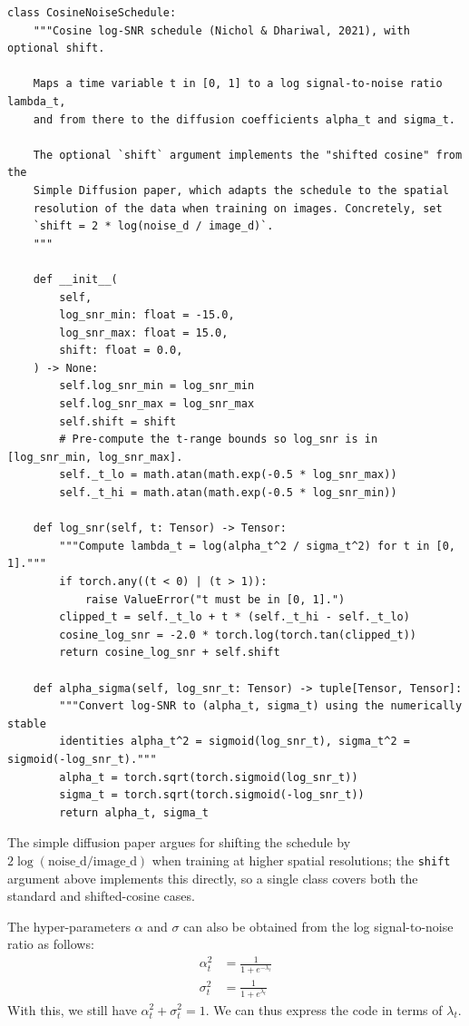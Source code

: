 \documentclass[usenames,dvipsnames]{article}
\begin{document}
\begin{verbatim}
class CosineNoiseSchedule:
    """Cosine log-SNR schedule (Nichol & Dhariwal, 2021), with optional shift.

    Maps a time variable t in [0, 1] to a log signal-to-noise ratio lambda_t,
    and from there to the diffusion coefficients alpha_t and sigma_t.

    The optional `shift` argument implements the "shifted cosine" from the
    Simple Diffusion paper, which adapts the schedule to the spatial
    resolution of the data when training on images. Concretely, set
    `shift = 2 * log(noise_d / image_d)`.
    """

    def __init__(
        self,
        log_snr_min: float = -15.0,
        log_snr_max: float = 15.0,
        shift: float = 0.0,
    ) -> None:
        self.log_snr_min = log_snr_min
        self.log_snr_max = log_snr_max
        self.shift = shift
        # Pre-compute the t-range bounds so log_snr is in [log_snr_min, log_snr_max].
        self._t_lo = math.atan(math.exp(-0.5 * log_snr_max))
        self._t_hi = math.atan(math.exp(-0.5 * log_snr_min))

    def log_snr(self, t: Tensor) -> Tensor:
        """Compute lambda_t = log(alpha_t^2 / sigma_t^2) for t in [0, 1]."""
        if torch.any((t < 0) | (t > 1)):
            raise ValueError("t must be in [0, 1].")
        clipped_t = self._t_lo + t * (self._t_hi - self._t_lo)
        cosine_log_snr = -2.0 * torch.log(torch.tan(clipped_t))
        return cosine_log_snr + self.shift

    def alpha_sigma(self, log_snr_t: Tensor) -> tuple[Tensor, Tensor]:
        """Convert log-SNR to (alpha_t, sigma_t) using the numerically stable
        identities alpha_t^2 = sigmoid(log_snr_t), sigma_t^2 = sigmoid(-log_snr_t)."""
        alpha_t = torch.sqrt(torch.sigmoid(log_snr_t))
        sigma_t = torch.sqrt(torch.sigmoid(-log_snr_t))
        return alpha_t, sigma_t
\end{verbatim}

The simple diffusion paper argues for shifting the schedule by $2 \log(\text{noise\_d} / \text{image\_d})$ when training at higher spatial resolutions; the \texttt{shift} argument above implements this directly, so a single class covers both the standard and shifted-cosine cases.


The hyper-parameters $\alpha$ and $\sigma$ can also be obtained from the log signal-to-noise ratio as follows:
\begin{align}
\alpha_t^2 &= \frac{1}{1+e^{-\lambda_t}}
\\
\sigma_t^2 &= \frac{1}{1+e^{\lambda_t}}
\end{align}
With this, we still have $\alpha_t^2 + \sigma_t^2 = 1$. We can thus express the code in terms of $\lambda_t$.
\end{document}
